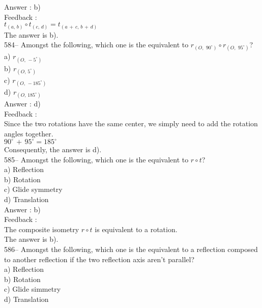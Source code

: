 \documentclass[letterpaper, 12pt]{article}
\begin{document}
Answer : b)\\

Feedback : \\
$t_{\left(a,\,b\right)} \circ t_{\left(c,\,d\right)
}=t_{\left(a\,+\,c,\,b\,+\,d\right) }$\\
The answer is b).\\

584-- Amongst the following, which one is the equivalent to
$r_{\left( O,\,\,90^{\circ}\right)} \circ r_{\left( O,\,\,95^{\circ}\right)
}$?\\
a) $r_{\left(O,\,-5^{\circ}\right) }$\\
b) $r_{\left(O,\,5^{\circ}\right) }$\\
c) $r_{\left(O,\,-185^{\circ}\right) }$\\
d) $r_{\left(O,\,185^{\circ}\right) }$\\

Answer : d)\\

Feedback : \\
Since the two rotations have the same center, we simply need to add the rotation angles together.\\
$90^{\circ}\,+\,95^{\circ}=185^{\circ}$\\
Consequently, the answer is d).\\

585-- Amongst the following, which one is the equivalent to $r\circ
t$?\\
a) Reflection\\
b) Rotation\\
c) Glide symmetry\\
d) Translation\\

Answer : b) \\

Feedback : \\
The composite isometry $r\circ t$ is equivalent to a rotation.\\
The answer is b).\\

586-- Amongst the following, which one is the equivalent to a reflection composed to another reflection if the two reflection axis aren't parallel?\\
a) Reflection\\
b) Rotation\\
c) Glide simmetry\\
d) Translation\\
\end{document}
